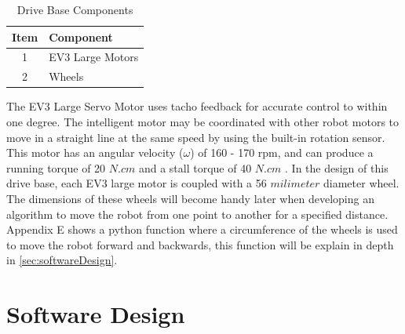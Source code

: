\begin{table}[!ht]
	\centering
	\caption{Drive Base Components}
	\vspace{-2mm}
	\label{tab:DriveBaseComponents}
	\begin{tabular}{cl}
		\hline
		\textbf{Item}&\textbf{Component}\\
		\hline
		1&EV3 Large Motors\\
		2&Wheels\\
		\hline			
	\end{tabular}
\end{table}

\noindent The EV3 Large Servo Motor uses tacho feedback for accurate control to within one degree. The intelligent motor may be coordinated with other robot motors to move in a straight line at the same speed by using the built-in rotation sensor. This motor has an angular velocity ($\omega$) of 160 - 170 rpm, and can produce a running torque of 20 $N.cm$ and a stall torque of 40 $N.cm$ \cite{raisingRobots}. In the design of this drive base, each EV3 large motor is coupled with a 56 $milimeter$ diameter wheel. The dimensions of these wheels will become handy later when developing an algorithm to move the robot from one point to another for a specified distance. Appendix E shows a python function where a circumference of the wheels is used to move the robot forward and backwards, this function will be explain in depth in \vref{sec:softwareDesign}.

\newpage
\section{Software Design}\label{sec:softwareDesign}

